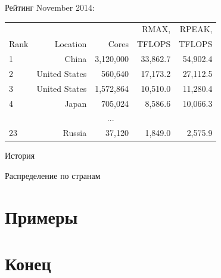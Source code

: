 \begin{frame}{Рейтинг}
November 2014:
\begin{table}[htpb]
    \begin{center}
    \begin{tabular}{|l|r|r|r|r|}
    \hline
            &                   &               &   RMAX,       &   RPEAK,      \\
    Rank    &   Location        &   Cores       &   TFLOPS      &   TFLOPS      \\
    \hline
    1       &   China           &   3,120,000   &   33,862.7    &   54,902.4    \\
    \hline
    2       &   United States   &   560,640     &   17,173.2    &   27,112.5    \\
    \hline
    3       &   United States   &   1,572,864   &   10,510.0    &   11,280.4    \\
    \hline
    4       &   Japan           &   705,024     &   8,586.6     &   10,066.3    \\
    \hline
    \multicolumn{5}{c}{...}                                                     \\
    \hline
    23      &   Russia          &   37,120      &   1,849.0     &   2,575.9     \\
    \hline
    \end{tabular}
    \end{center}
\end{table}
\end{frame}

\begin{frame}{История}
\begin{figure}
\end{figure}
\end{frame}

\begin{frame}{Распределение по странам}
\begin{figure}
\end{figure}
\end{frame}

\section{Примеры}

\section*{Конец}

